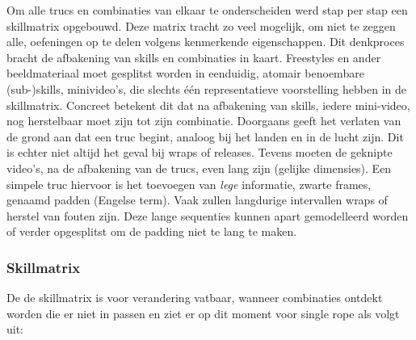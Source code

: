 Om alle trucs en combinaties van elkaar te onderscheiden werd stap per stap een skillmatrix opgebouwd. Deze matrix tracht zo veel mogelijk, om niet te zeggen alle, oefeningen op te delen volgens kenmerkende eigenschappen. Dit denkproces bracht de afbakening van skills en combinaties in kaart.
Freestyles en ander beeldmateriaal moet gesplitst worden in eenduidig, atomair benoembare (sub-)skills, minivideo's, die slechts één representatieve voorstelling hebben in de skillmatrix.
Concreet betekent dit dat na afbakening van skills, iedere mini-video, nog herstelbaar moet zijn tot zijn combinatie.
Doorgaans geeft het verlaten van de grond aan dat een truc begint, analoog bij het landen en in de lucht zijn. Dit is echter niet altijd het geval bij wraps of releases. Tevens moeten de geknipte video's, na de afbakening van de trucs, even lang zijn (gelijke dimensies). Een simpele truc hiervoor is het toevoegen van \emph{lege} informatie, zwarte frames, genaamd padden (Engelse term). Vaak zullen langdurige intervallen wraps of herstel van fouten zijn. Deze lange sequenties kunnen apart gemodelleerd worden of verder opgesplitst om de padding niet te lang te maken.

\subsubsection{Skillmatrix}

De de skillmatrix is voor verandering vatbaar, wanneer combinaties ontdekt worden die er niet in passen en ziet er op dit moment voor single rope als volgt uit:

